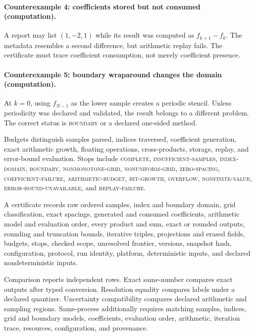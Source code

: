\paragraph{Counterexample 4: coefficients stored but not consumed (computation).}
A report may list \((1,-2,1)\) while its result was computed as \(f_{k+1}-f_k\).  The metadata resembles a second
difference, but arithmetic replay fails.  The certificate must trace coefficient consumption, not merely coefficient
presence.

\paragraph{Counterexample 5: boundary wraparound changes the domain (computation).}
At \(k=0\), using \(f_{N-1}\) as the lower sample creates a periodic stencil.  Unless periodicity was declared and
validated, the result belongs to a different problem.  The correct status is \textsc{boundary} or a declared
one-sided method.

Budgets distinguish samples parsed, indices traversed, coefficient generation, exact arithmetic growth, floating
operations, cross-products, storage, replay, and error-bound evaluation.  Stops include \textsc{complete},
\textsc{insufficient-samples}, \textsc{index-domain}, \textsc{boundary}, \textsc{nonmonotone-grid},
\textsc{nonuniform-grid}, \textsc{zero-spacing}, \textsc{coefficient-failure},
\textsc{arithmetic-budget}, \textsc{bit-growth}, \textsc{overflow}, \textsc{nonfinite-value},
\textsc{error-bound-unavailable}, and \textsc{replay-failure}.

A certificate records raw ordered samples, index and boundary domain, grid classification, exact spacings, generated
and consumed coefficients, arithmetic model and evaluation order, every product and sum, exact or rounded outputs,
rounding and truncation bounds, iterative triples, projections and erased fields, budgets, stops, checked scope,
unresolved frontier, versions, snapshot hash, configuration, protocol, run identity, platform, deterministic inputs,
and declared nondeterministic inputs.

Comparison reports independent rows.  Exact same-number compares exact outputs after typed conversion.  Resolution
equality compares labels under a declared quantizer.  Uncertainty compatibility compares declared arithmetic and
sampling regions.  Same-process additionally requires matching samples, indices, grid and boundary models,
coefficients, evaluation order, arithmetic, iteration trace, resources, configuration, and provenance.

